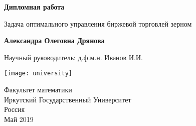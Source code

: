 \begin{titlepage}
    \begin{center}
        \vspace*{1cm}
        
        \Huge
        \textbf{Дипломная работа}
        
        \vspace{0.5cm}
        \LARGE
        Задача оптимального управления биржевой торговлей зерном
        
        \vspace{1.5cm}
        
        \textbf{Александра Олеговна Дрянова}
        
        \vfill
        
        Научный руководитель: д.ф.м.н. Иванов И.И.
        
        \vspace{0.8cm}
        
        \texttt{[image: university]}
        
        \Large
        Факультет математики\\
        Иркутский Государственный Университет\\
        Россия\\
        Май 2019
        
    \end{center}
\end{titlepage}